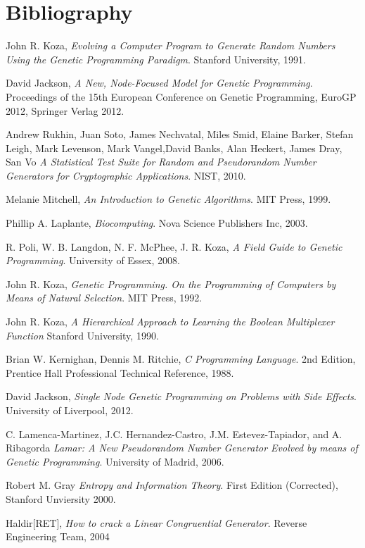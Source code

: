 \documentclass[a4paper,10.5pt]{article}
\begin{document}
\section{Bibliography}
\begin{thebibliography}{12}

  John R. Koza, 
  \emph{Evolving a Computer Program to Generate Random Numbers Using the Genetic Programming Paradigm}. 
  Stanford University, 
  1991.

David Jackson,
  \emph{A New, Node-Focused Model for Genetic Programming}.
  Proceedings of the 15th European Conference on Genetic Programming, EuroGP 2012, 
  Springer Verlag
  2012.

  Andrew Rukhin, Juan Soto, James Nechvatal, Miles Smid, Elaine Barker, Stefan Leigh, Mark Levenson, Mark Vangel,David Banks, Alan Heckert, James Dray, San Vo 
  \emph{A Statistical Test Suite for Random and Pseudorandom Number Generators for Cryptographic Applications}. 
  NIST,
  2010.

  Melanie Mitchell,
  \emph{An Introduction to Genetic Algorithms}.
  MIT Press,
  1999.

  Phillip A. Laplante,
  \emph{Biocomputing}.
  Nova Science Publishers Inc,
  2003.

  R. Poli, W. B. Langdon, N. F. McPhee, J. R. Koza, 
  \emph{A Field Guide to Genetic Programming}. 
  University of Essex, 
  2008.

  John R. Koza, 
  \emph{Genetic Programming. On the Programming of Computers by Means of Natural Selection}. 
  MIT Press, 
  1992.

  John R. Koza,
  \emph{A Hierarchical Approach to Learning the Boolean Multiplexer Function}
  Stanford University,
  1990.

  Brian W. Kernighan, Dennis M. Ritchie, 
  \emph{C Programming Language}.
  2nd Edition, 
  Prentice Hall Professional Technical Reference, 
  1988.

    David Jackson,
  \emph{Single Node Genetic Programming on Problems with Side Effects}.
  University of Liverpool,
  2012.

  C. Lamenca-Martinez, J.C. Hernandez-Castro,
  J.M. Estevez-Tapiador, and A. Ribagorda
  \emph{Lamar: A New Pseudorandom Number Generator Evolved by means of Genetic Programming}.
  University of Madrid,
  2006.

  Robert M. Gray
  \emph{Entropy and Information Theory}.
  First Edition (Corrected),
  Stanford Unviersity
  2000.

  Haldir[RET],
  \emph{How to crack a Linear Congruential Generator}.
  Reverse Engineering Team,
  2004


\end{thebibliography}
\newpage
\end{document}
